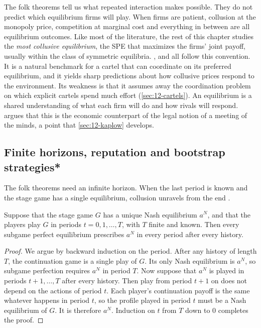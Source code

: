 The folk theorems tell us what repeated interaction makes possible. They do not predict which equilibrium firms will
play. When firms are patient, collusion at the monopoly price, competition at marginal cost and everything in between
are all equilibrium outcomes. Like most of the literature, the rest of this chapter studies the \emph{most collusive
equilibrium}, the SPE that maximizes the firms' joint payoff, usually within the class of symmetric equilibria.
\citet{RotembergSaloner1986}, \citet{BagwellStaiger1997} and \citet{AtheyBagwellSanchirico2004} all follow this
convention. It is a natural benchmark for a cartel that can coordinate on its preferred equilibrium, and it yields
sharp predictions about how collusive prices respond to the environment. Its weakness is that it assumes away the
coordination problem on which explicit cartels spend much effort (\cref{sec:12-cartels}). An equilibrium is a shared
understanding of what each firm will do and how rivals will respond. \citet[pp.~196--199]{Kaplow2013} argues that
this is the economic counterpart of the legal notion of a meeting of the minds, a point that \cref{sec:12-kaplow}
develops.

\subsection{Finite horizons, reputation and bootstrap strategies*}\label{sec:12-finite}

The folk theorems need an infinite horizon. When the last period is known and the stage game has a single
equilibrium, collusion unravels from the end \citep[section~6.3.1]{Tirole1988}.

\begin{proposition}\label{prop:12-finite}
Suppose that the stage game $G$ has a unique Nash equilibrium $a^N$, and that the players play $G$ in periods
$t = 0, 1, \dots, T$, with $T$ finite and known. Then every subgame perfect equilibrium prescribes $a^N$ in every
period after every history.
\end{proposition}

\begin{proof}
We argue by backward induction on the period. After any history of length $T$, the continuation game is a single
play of $G$. Its only Nash equilibrium is $a^N$, so subgame perfection requires $a^N$ in period $T$. Now suppose
that $a^N$ is played in periods $t + 1, \dots, T$ after every history. Then play from period $t + 1$ on does not
depend on the actions of period $t$. Each player's continuation payoff is the same whatever happens in period $t$,
so the profile played in period $t$ must be a Nash equilibrium of $G$. It is therefore $a^N$. Induction on $t$ from
$T$ down to $0$ completes the proof.
\end{proof}

